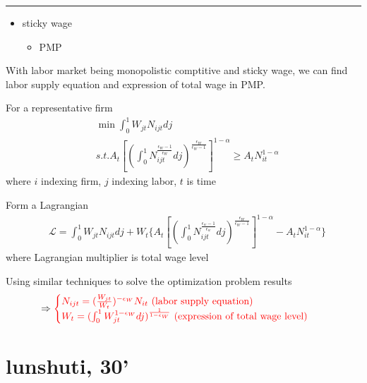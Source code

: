 \documentclass{article}
\newcommand*\sepline{%
  \begin{center}
    \rule[1ex]{.5\textwidth}{.5pt}
  \end{center}}
\begin{document}
\sepline

\begin{itemize}
  \item sticky wage
  \begin{itemize}
    \item PMP
  \end{itemize}
\end{itemize}

With labor market being monopolistic comptitive and sticky wage, we can find labor supply equation and expression of total wage in PMP.

For a representative firm
\begin{equation}
\begin{split}
& \min \int_0^1 W_{jt} N_{ijt}dj
\\& s.t. A_t[(\int_0^1 N_{ijt}^{\frac{\epsilon_W-1}{\epsilon_W}}dj)^{\frac{\epsilon_W}{\epsilon_W-1}}]^{1-\alpha}\geqslant A_t N_{it}^{1-\alpha}
\end{split}
\end{equation}
where $i$ indexing firm, $j$ indexing labor, $t$ is time


Form a Lagrangian
\begin{align}
& \mathcal{L}=\int_0^1 W_{jt} N_{ijt}dj+W_t\{
A_t[(\int_0^1 N_{ijt}^{\frac{\epsilon_w-1}{\epsilon_w}}dj)^{\frac{\epsilon_W}{\epsilon_W-1}}]^{1-\alpha}-A_t N_{it}^{1-\alpha}
\}
\end{align}
where Lagrangian multiplier is total wage level

Using similar techniques to solve the optimization problem results
\begin{align}
& \Rightarrow 
\color{red}
\begin{cases}
N_{ijt}=(\frac{W_{jt}}{W_t})^{-\epsilon_W}N_{it} \text{ (labor supply equation)}
\\
W_t=(\int_0^1 W_{jt}^{1-\epsilon_W}dj)^{\frac{1}{1-\epsilon_W}} \text{ (expression of total wage level)}
\end{cases}
\end{align}

















\newpage
\section{lunshuti, 30'}
\end{document}
